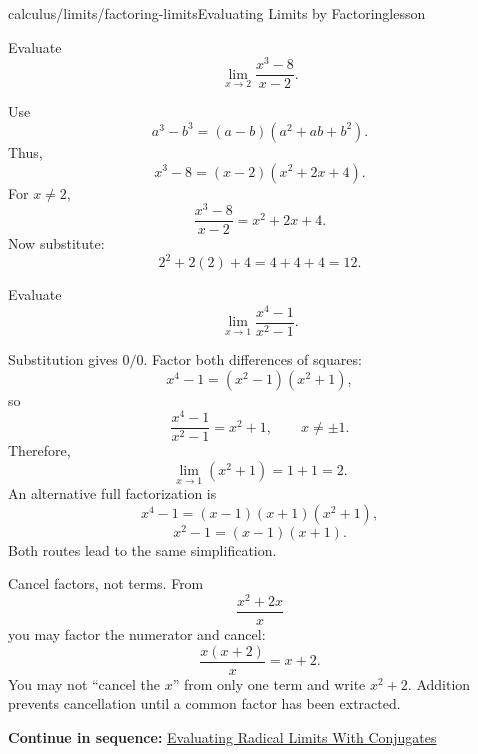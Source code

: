 \documentclass[11pt,openany]{book}
\theoremstyle{bgplain}
\newcounter{bgexample}[chapter]
\newcommand{\webnext}[2]{%
  \par\addvspace{1.2em}\noindent{\color{BGLine}\rule{\textwidth}{0.35pt}}\par\smallskip
  {\small\color{BGGray}\textbf{Continue in sequence:} \hyperlink{web:#1}{#2}}\par
}
\begin{document}
\begin{webpage}{calculus/limits/factoring-limits}{Evaluating Limits by Factoring}{lesson}
\begin{bgexample}[title={Difference of cubes}]
Evaluate
\[
  \lim_{x\to2}\frac{x^3-8}{x-2}.
\]

\begin{bgsolution}
Use
\[
  a^3-b^3=(a-b)(a^2+ab+b^2).
\]
Thus,
\[
  x^3-8=(x-2)(x^2+2x+4).
\]
For \(x\ne2\),
\[
  \frac{x^3-8}{x-2}=x^2+2x+4.
\]
Now substitute:
\[
  2^2+2(2)+4=4+4+4=\boxed{12}.
\]
\end{bgsolution}
\end{bgexample}

\begin{bgexample}[title={Exam-level: factor more than once}]
Evaluate
\[
  \lim_{x\to1}\frac{x^4-1}{x^2-1}.
\]

\begin{bgsolution}
Substitution gives \(0/0\). Factor both differences of squares:
\[
  x^4-1=(x^2-1)(x^2+1),
\]
so
\[
  \frac{x^4-1}{x^2-1}=x^2+1,\qquad x\ne\pm1.
\]
Therefore,
\[
  \lim_{x\to1}(x^2+1)=1+1=\boxed{2}.
\]
An alternative full factorization is
\[
  x^4-1=(x-1)(x+1)(x^2+1),
\]
\[
  x^2-1=(x-1)(x+1).
\]
Both routes lead to the same simplification.
\end{bgsolution}
\end{bgexample}

\begin{bgexamnote}
Cancel factors, not terms. From
\[
  \frac{x^2+2x}{x}
\]
you may factor the numerator and cancel:
\[
  \frac{x(x+2)}{x}=x+2.
\]
You may not ``cancel the \(x\)'' from only one term and write \(x^2+2\). Addition prevents cancellation until a common factor has been extracted.
\end{bgexamnote}
\webnext{calculus/limits/rationalizing-radicals}{Evaluating Radical Limits With Conjugates}
\end{webpage}
\end{document}
